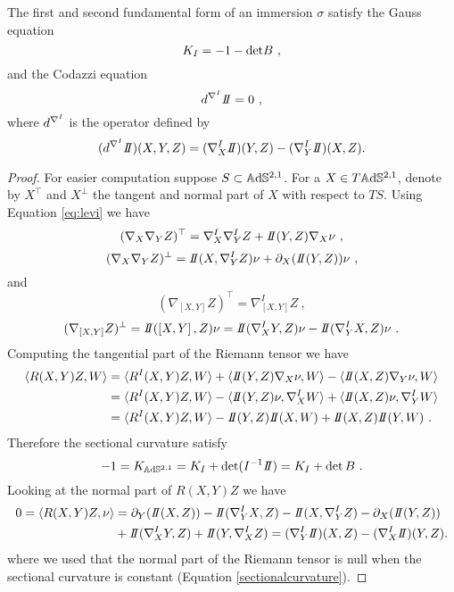 \begin{theorem}
    The first and second fundamental form of an immersion $\sigma$ satisfy the Gauss equation   
    \[
        K_I = -1 - \text{det}B \ ,
    \]
    and the Codazzi equation
    \[
        d^{\nabla^\I}\II=0 \ ,
    \]
    where $d^{\nabla^I}$ is the operator defined by
    \[
        (d^{\nabla^\I}\II)(X,Y,Z) = (\nabla^\I_X \II)(Y,Z) - (\nabla^\I_Y \II)(X,Z) .
    \]
\end{theorem}
\begin{proof}
    For easier computation suppose $S \subset \mathbb{A}\mathrm{d}\mathbb{S}^{2,1}$. For a $X\in T\mathbb{A}\mathrm{d}\mathbb{S}^{2,1}$, denote by $X^\top$ and $X^\perp$ the tangent and normal part of $X$ with respect to $TS$. Using Equation \ref{eq:levi} we have
        \[
        (\nabla_X \nabla_Y Z)^\top = \nabla^I_X \nabla^I_Y Z + \II(Y,Z) \nabla_X \nu \ ,
    \] 
    \[
        (\nabla_X \nabla_Y Z)^\perp = \II(X, \nabla^I_Y Z) \nu + \partial_X (\II (Y,Z)) \nu \ ,
    \] 
    and
    \[
        (\nabla_{\left[ X,Y \right]} Z)^\top = \nabla^I_{\left[ X,Y \right]} Z \ ,
    \]
    \[
        (\nabla_{\left[ X,Y \right]} Z)^\perp = \II(\left[ X,Y \right], Z) \nu = \II(\nabla^I_X Y,Z) \nu - \II(\nabla^I_Y X,Z)\nu \ .
    \]
    Computing the tangential part of the Riemann tensor we have
    \[
    \begin{split}
        \langle R(X,Y)Z,W \rangle & = \langle R^I(X,Y)Z,W \rangle + \langle \II(Y,Z) \nabla_X \nu,  W \rangle - \langle \II(X,Z) \nabla_Y \nu, W \rangle \\
        & = \langle R^I(X,Y)Z,W \rangle - \langle \II(Y,Z) \nu, \nabla^I_X W \rangle + \langle \II(X,Z) \nu, \nabla^I_Y W \rangle \\
        & = \langle R^I(X,Y)Z,W \rangle - \II(Y,Z) \II(X,W) + \II(X,Z) \II(Y,W) \ .
    \end{split}
    \]
    Therefore the sectional curvature satisfy
    \[
        -1 = K_{\A^{2,1}} = K_I + \det(\I^{-1}\II) = K_I + \det B \ .
    \]
    Looking at the normal part of $R(X,Y)Z$ we have
    \[
    \begin{split}
        0 = \langle R(X,Y)Z,\nu \rangle & = 
        \partial_Y (\II (X,Z)) -\II(\nabla^I_Y X,Z) -\II(X, \nabla^I_Y Z) -\partial_X (\II (Y,Z)) \\ 
        & + \II(\nabla^I_X Y,Z)+\II(Y, \nabla^I_X Z) = (\nabla^I_Y \II)(X,Z) - (\nabla^I_X \II)(Y,Z).
    \end{split}
    \]
    where we used that the normal part of the Riemann tensor is null when the sectional curvature is constant (Equation \ref{sectionalcurvature}).
\end{proof}

